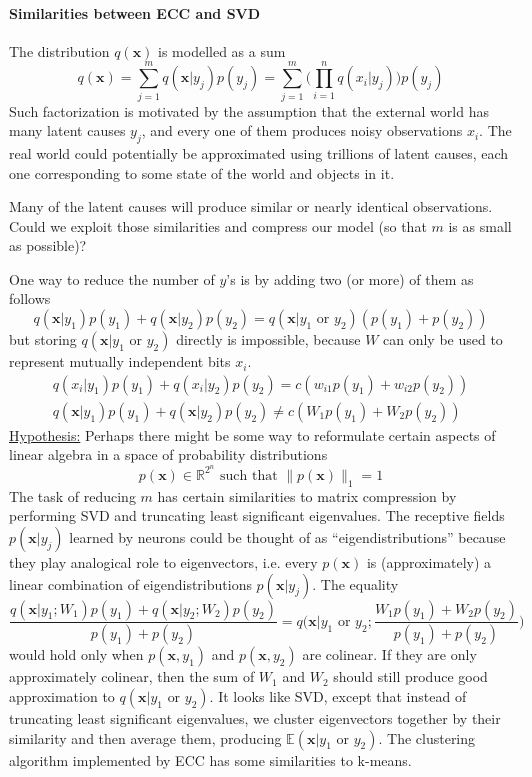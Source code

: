\documentclass[12pt]{article}
\begin{document}
\paragraph{Similarities between ECC and SVD}

The distribution $q(\boldsymbol{x})$ is modelled as a sum
\[
q(\boldsymbol{x}) = \sum_{j=1}^{m}q(\boldsymbol{x}|y_j)p(y_j)  = \sum_{j=1}^{m}\big(\prod_{i=1}^n q(x_i|y_j)\big)p(y_j) 
\]
Such factorization is motivated by the assumption that the external world has many latent causes $y_j$, and every one of them produces noisy observations $x_i$. The real world could potentially be approximated using trillions of latent causes, each one corresponding to some state of the world and objects in it. 

Many of the latent causes will produce similar or nearly identical observations. Could we exploit those similarities and compress our model (so that $m$ is as small as possible)? 

One way to reduce the number of $y$'s is by adding two (or more) of them as follows
\[
q(\boldsymbol{x}|y_1) p(y_1)+q(\boldsymbol{x}|y_2) p(y_2) = 
q(\boldsymbol{x}|y_1\text{ or }y_2) (p(y_1)+p(y_2))
\]
but storing $q(\boldsymbol{x}|y_1\text{ or }y_2)$ directly is impossible, because $W$ can only be used to represent mutually independent bits $x_i$. 
\begin{gather*}
q(x_i|y_1) p(y_1)+q(x_i|y_2) p(y_2) = c(w_{i1}p(y_1) +w_{i2}p(y_2))  \\
q(\boldsymbol{x}|y_1) p(y_1)+q(\boldsymbol{x}|y_2) p(y_2) \ne c(W_1p(y_1) +W_2p(y_2)) 
\end{gather*}
\underline{Hypothesis:} Perhaps there might be some way to reformulate certain aspects of linear algebra in a space of probability distributions 
\[p(\boldsymbol{x})\in \mathbb{R}^{2^n} \text{ such that } \lVert p(\boldsymbol{x}) \rVert_1=1\]
The task of reducing $m$ has certain similarities to matrix compression by performing SVD and truncating least significant eigenvalues. The receptive fields $p(\boldsymbol{x}|y_j)$ learned by neurons could be thought of as ``eigendistributions'' because they play analogical role to eigenvectors, i.e. every $p(\boldsymbol{x})$ is (approximately) a linear combination of eigendistributions $p(\boldsymbol{x}|y_j)$. The equality 
\[
\frac{q(\boldsymbol{x}|y_1;W_1) p(y_1)+q(\boldsymbol{x}|y_2;W_2) p(y_2)}{p(y_1)+p(y_2)} = 
q\big(\boldsymbol{x}|y_1\text{ or }y_2;\frac{W_1p(y_1) +W_2p(y_2)}{p(y_1)+p(y_2)}\big) 
\]
would hold only when $p(\boldsymbol{x},y_1)$ and $p(\boldsymbol{x},y_2)$ are colinear. If they are only approximately colinear, then the sum of $W_1$ and $W_2$ should still produce good approximation to $q(\boldsymbol{x}|y_1\text{ or }y_2)$. It looks like SVD, except that instead of truncating least significant eigenvalues, we cluster eigenvectors together by their similarity and then average them, producing $\mathbb{E}(\boldsymbol{x}|y_1\text{ or }y_2)$. The clustering algorithm implemented by ECC has some similarities to k-means.
\end{document}
